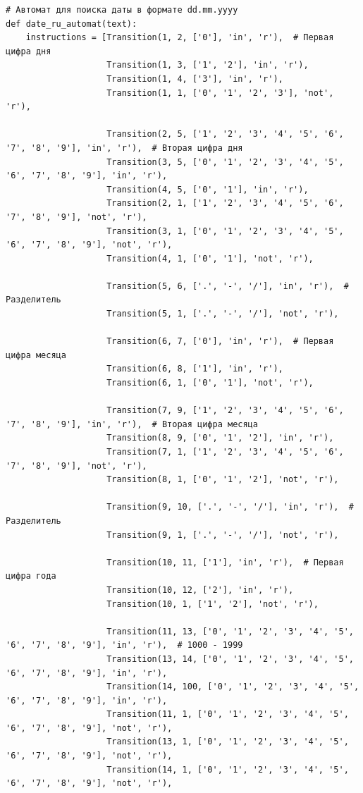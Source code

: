 \documentclass[a4paper, 14pt]{article}
\begin{document}
		\begin{lstlisting}[label=some-code,caption=Автомат для поиска даты в формате dd.mm.yyyy]
		# Автомат для поиска даты в формате dd.mm.yyyy
def date_ru_automat(text):
    instructions = [Transition(1, 2, ['0'], 'in', 'r'),  # Первая цифра дня
                    Transition(1, 3, ['1', '2'], 'in', 'r'),
                    Transition(1, 4, ['3'], 'in', 'r'),
                    Transition(1, 1, ['0', '1', '2', '3'], 'not', 'r'),

                    Transition(2, 5, ['1', '2', '3', '4', '5', '6', '7', '8', '9'], 'in', 'r'),  # Вторая цифра дня
                    Transition(3, 5, ['0', '1', '2', '3', '4', '5', '6', '7', '8', '9'], 'in', 'r'),
                    Transition(4, 5, ['0', '1'], 'in', 'r'),
                    Transition(2, 1, ['1', '2', '3', '4', '5', '6', '7', '8', '9'], 'not', 'r'),
                    Transition(3, 1, ['0', '1', '2', '3', '4', '5', '6', '7', '8', '9'], 'not', 'r'),
                    Transition(4, 1, ['0', '1'], 'not', 'r'),

                    Transition(5, 6, ['.', '-', '/'], 'in', 'r'),  # Разделитель
                    Transition(5, 1, ['.', '-', '/'], 'not', 'r'),

                    Transition(6, 7, ['0'], 'in', 'r'),  # Первая цифра месяца
                    Transition(6, 8, ['1'], 'in', 'r'),
                    Transition(6, 1, ['0', '1'], 'not', 'r'),

                    Transition(7, 9, ['1', '2', '3', '4', '5', '6', '7', '8', '9'], 'in', 'r'),  # Вторая цифра месяца
                    Transition(8, 9, ['0', '1', '2'], 'in', 'r'),
                    Transition(7, 1, ['1', '2', '3', '4', '5', '6', '7', '8', '9'], 'not', 'r'),
                    Transition(8, 1, ['0', '1', '2'], 'not', 'r'),

                    Transition(9, 10, ['.', '-', '/'], 'in', 'r'),  # Разделитель
                    Transition(9, 1, ['.', '-', '/'], 'not', 'r'),

                    Transition(10, 11, ['1'], 'in', 'r'),  # Первая цифра года
                    Transition(10, 12, ['2'], 'in', 'r'),
                    Transition(10, 1, ['1', '2'], 'not', 'r'),

                    Transition(11, 13, ['0', '1', '2', '3', '4', '5', '6', '7', '8', '9'], 'in', 'r'),  # 1000 - 1999
                    Transition(13, 14, ['0', '1', '2', '3', '4', '5', '6', '7', '8', '9'], 'in', 'r'),
                    Transition(14, 100, ['0', '1', '2', '3', '4', '5', '6', '7', '8', '9'], 'in', 'r'),
                    Transition(11, 1, ['0', '1', '2', '3', '4', '5', '6', '7', '8', '9'], 'not', 'r'),
                    Transition(13, 1, ['0', '1', '2', '3', '4', '5', '6', '7', '8', '9'], 'not', 'r'),
                    Transition(14, 1, ['0', '1', '2', '3', '4', '5', '6', '7', '8', '9'], 'not', 'r'),


\end{lstlisting}
\end{document}

